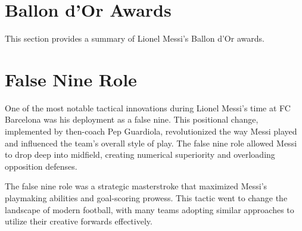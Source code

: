 \section{Ballon d'Or Awards}\label{sec:ballon_dor}

This section provides a summary of Lionel Messi's Ballon d'Or awards.



\section{False Nine Role}\label{sec:false_nine}

One of the most notable tactical innovations during Lionel Messi's time at FC 
Barcelona was his deployment as a false nine.
This positional change, implemented by then-coach Pep Guardiola, revolutionized
the way Messi played and influenced the team's overall style of play.
The false nine role allowed Messi to drop deep into midfield, creating numerical
superiority and overloading opposition defenses.



The false nine role was a strategic masterstroke that maximized Messi's
playmaking abilities and goal-scoring prowess.
This tactic went to change the landscape of modern football, with many teams
adopting similar approaches to utilize their creative forwards effectively.
